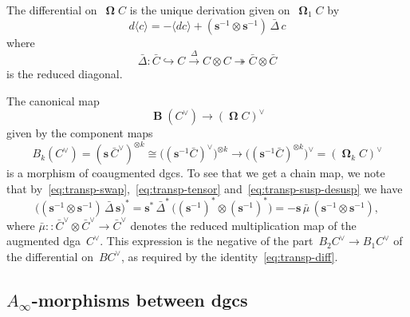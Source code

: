 \documentclass[letterpaper]{amsart}
\numberwithin{equation}{section}
\theoremstyle{plain}
\theoremstyle{definition}
\theoremstyle{remark}
\def\Ainf{A_{\infty}}
\DeclareMathOperator{\BB}{\mathbf{B}}
\def\susp{\mathbf{s}}
\def\desusp{\susp^{-1}}
\DeclareMathOperator{\Cobar}{\mathbf{\Omega}}
\def\CobarEl#1{\langle#1\rangle}
\begin{document}
The differential on~$\Cobar C$ is the unique derivation given on~$\Cobar_{1}C$ by
\begin{equation}
  d\CobarEl{c} = -\CobarEl{dc} + (\desusp\otimes\desusp)\,\bar\Delta\,c
\end{equation}
where
\begin{equation}
  \bar\Delta\colon \bar C \hookrightarrow C  \xrightarrow{\Delta} C \otimes C \twoheadrightarrow \bar C\otimes\bar C
\end{equation}
is the reduced diagonal.

The canonical map
\begin{equation}
  \BB(C^{\vee}) \to (\Cobar C)^{\vee}
\end{equation}
given by the component maps
\begin{equation}
  B_{k}(C^{\vee}) = (\susp\,\bar C^{\vee})^{\otimes k} \cong \bigl((\desusp \bar C)^{\vee}\bigr)^{\otimes k}
  \to \bigl((\desusp \bar C)^{\otimes k}\bigr)^{\vee} = (\Cobar_{k} C)^{\vee}
\end{equation}
is a morphism of coaugmented dgcs. To see that we get a chain map, we note that
by~\eqref{eq:transp-swap},~\eqref{eq:transp-tensor} and~\eqref{eq:transp-susp-desusp} we have
\begin{equation}
  \bigl((\desusp\otimes\desusp)\,\bar\Delta\,\susp\bigr)^{*}
  = \susp^{*}\,\bar\Delta^{*}\,\bigl((\desusp)^{*}\otimes(\desusp)^{*}\bigr)
  = -\susp\,\bar\mu\,(\desusp\otimes\desusp),
\end{equation}
where $\bar\mu\colon\colon \bar C^{\vee}\otimes \bar C^{\vee}\to \bar C^{\vee}$
denotes the reduced multiplication map of the augmented dga~$C^{\vee}$.
This expression is the negative of the part~$B_{2}C^{\vee}\to B_{1}C^{\vee}$ of the differential on~$BC^{\vee}$,
as required by the identity~\eqref{eq:transp-diff}.


\subsection{\texorpdfstring{$\Ainf$}{A∞}-morphisms between dgcs}
\end{document}
